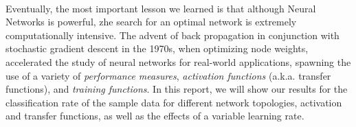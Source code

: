 \documentclass[a4paper,12pt,oneside,final]{report}
\begin{document}
\paragraph{}
Eventually, the most important lesson we learned is that although Neural Networks is powerful, zhe search for an optimal network is extremely computationally intensive.  The advent of back propagation in conjunction with stochastic gradient descent in the 1970s, when optimizing node weights, accelerated the study of neural networks for real-world applications, spawning the use of a variety of \emph{performance measures}, \emph{activation functions} (a.k.a. transfer functions), and \emph{training functions}.  In this report, we will show our results for the classification rate of the sample data for different network topologies, activation and transfer functions, as well as the effects of a variable learning rate. 




\begin{appendices}

\end{appendices}
\end{document}
